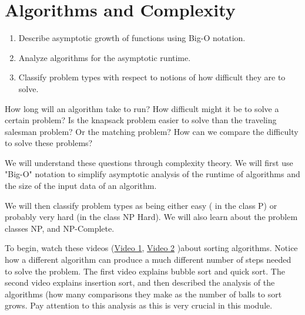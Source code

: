 

%
%

\chapter{Algorithms and Complexity}
\label{sec:complexity}
\begin{outcome}
\begin{enumerate}
\item Describe asymptotic growth of functions using Big-O notation.
\item Analyze algorithms for the asymptotic runtime.
\item Classify problem types with respect to notions of how difficult they are to solve.
\end{enumerate}
\end{outcome}




How long will an algorithm take to run?   How difficult might it be to solve a certain problem?   Is the knapsack problem easier to solve than the traveling salesman problem?  Or the matching problem?  
How can we compare the difficulty to solve these problems?

 

We will understand these questions through complexity theory.   We will first use "Big-O" notation to simplify asymptotic analysis of the runtime of algorithms and the size of the input data of an algorithm.  

We will then classify problem types as being either easy ( in the class P) or probably very hard (in the class NP Hard).  We will also learn about the problem classes NP, and NP-Complete.  

To begin, watch these videos (\href{https://www.youtube.com/watch?v=aXXWXz5rF64}{Video 1}, \href{https://youtu.be/TZRWRjq2CAg}{Video 2} )about sorting algorithms.  Notice how a different algorithm can produce a much different number of steps needed to solve the problem.  The first video explains bubble sort and quick sort. The second video explains insertion sort, and then described the analysis of the algorithms (how many comparisons they make as the number of balls to sort grows.    Pay attention to this analysis as this is very crucial in this module.



